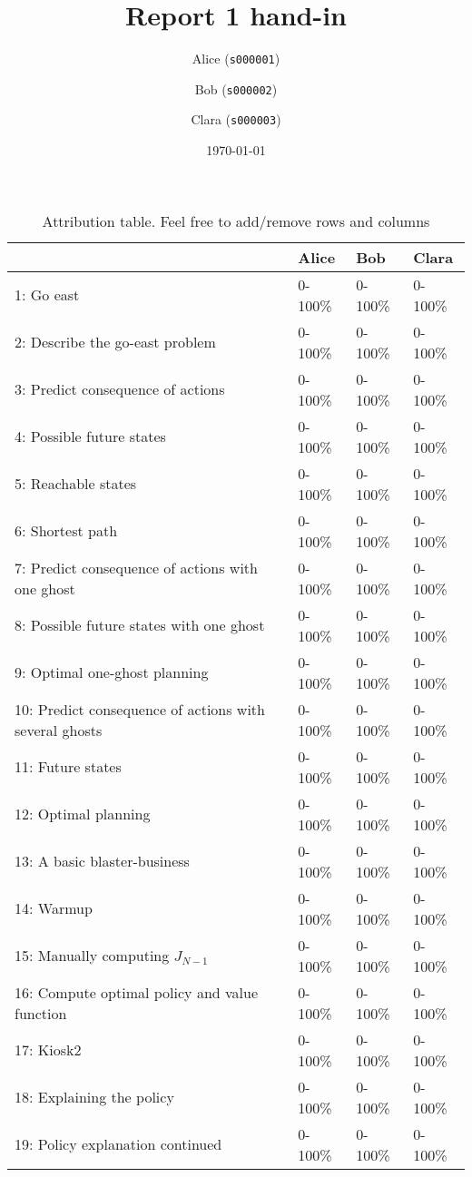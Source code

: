 \documentclass[12pt,twoside]{article}
\title{ Report 1 hand-in }
\date{ \today }
\author{Alice (\texttt{s000001})\and  Bob (\texttt{s000002})\and Clara (\texttt{s000003}) }
\begin{document}
\maketitle

\begin{table}[ht!]
\caption{Attribution table. Feel free to add/remove rows and columns}
\begin{tabular}{llll}
\toprule
                                                        & Alice   & Bob    & Clara   \\
\midrule
 1: Go east                                             & 0-100\%  & 0-100\% & 0-100\%  \\
 2: Describe the go-east problem                        & 0-100\%  & 0-100\% & 0-100\%  \\
 3: Predict consequence of actions                      & 0-100\%  & 0-100\% & 0-100\%  \\
 4: Possible future states                              & 0-100\%  & 0-100\% & 0-100\%  \\
 5: Reachable states                                    & 0-100\%  & 0-100\% & 0-100\%  \\
 6: Shortest path                                       & 0-100\%  & 0-100\% & 0-100\%  \\
 7: Predict consequence of actions with one ghost       & 0-100\%  & 0-100\% & 0-100\%  \\
 8: Possible future states with one ghost               & 0-100\%  & 0-100\% & 0-100\%  \\
 9: Optimal one-ghost planning                          & 0-100\%  & 0-100\% & 0-100\%  \\
 10: Predict consequence of actions with several ghosts & 0-100\%  & 0-100\% & 0-100\%  \\
 11: Future states                                      & 0-100\%  & 0-100\% & 0-100\%  \\
 12: Optimal planning                                   & 0-100\%  & 0-100\% & 0-100\%  \\
 13: A basic blaster-business                           & 0-100\%  & 0-100\% & 0-100\%  \\
 14: Warmup                                             & 0-100\%  & 0-100\% & 0-100\%  \\
 15: Manually computing $J_{N-1}$                       & 0-100\%  & 0-100\% & 0-100\%  \\
 16: Compute optimal policy and value function          & 0-100\%  & 0-100\% & 0-100\%  \\
 17: Kiosk2                                             & 0-100\%  & 0-100\% & 0-100\%  \\
 18: Explaining the policy                              & 0-100\%  & 0-100\% & 0-100\%  \\
 19: Policy explanation continued                       & 0-100\%  & 0-100\% & 0-100\%  \\
\bottomrule
\end{tabular}
\end{table}
\end{document}
